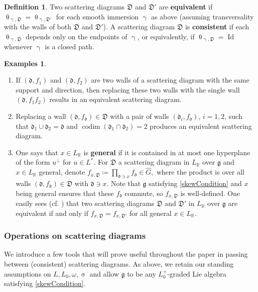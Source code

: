 \documentclass{amsart}
\DeclareMathOperator{\codim}{codim}
\DeclareMathOperator{\id}{Id}
\let\bb=\mathbb
\let\f=\mathfrak
\renewcommand{\theta}{\uptheta}
\renewcommand{\gamma}{\upgamma}
\renewcommand{\sigma}{\upsigma}
\theoremstyle{plain}%
\theoremstyle{definition}
\newtheorem{dfn}[thm]{Definition}
\newtheorem{egs}[thm]{Examples}
\theoremstyle{remark}
\begin{document}
\begin{dfn}
Two scattering diagrams $\f{D}$ and $\f{D}'$ are  \textbf{equivalent} if $\theta_{\gamma,\f{D}} = \theta_{\gamma,\f{D}'}$ for each smooth immersion $\gamma$ as above (assuming transversality with the walls of both $\f{D}$ and $\f{D}'$).  A scattering diagram $\f{D}$ is \textbf{consistent} if each $\theta_{\gamma,\f{D}}$ depends only on the endpoints of $\gamma$, or equivalently, if $\theta_{\gamma,\f{D}}=\id$ whenever $\gamma$ is a closed path.
\end{dfn}

\begin{egs}\label{EquivEx}
~

\begin{enumerate}
    \item If $(\f{d},f_1)$ and $(\f{d},f_2)$ are two walls of a scattering diagram with the same support and direction, then replacing these two walls with the single wall $(\f{d},f_1f_2)$ results in an equivalent scattering diagram.
    \item Replacing a wall $(\f{d},f_{\f{d}})\in \f{D}$ with a pair of walls $(\f{d}_i,f_{\f{d}})$, $i=1,2$, such that $\f{d}_1\cup \f{d}_2=\f{d}$ and $\codim(\f{d}_1\cap \f{d}_2)=2$ produces an equivalent scattering diagram.
    \item One says that $x\in L_{\bb{R}}$ is \textbf{general} if it is contained in at most one hyperplane of the form $u^{\perp}$ for $u\in L^*$.  For $\f{D}$ a scattering diagram in $L_{\bb{R}}$ over $\f{g}$ and $x\in L_{\bb{R}}$ general, denote $f_{x,\f{D}}\coloneqq \prod_{\f{d}\ni x} f_{\f{d}}\in \hat{G},$ where the product is over all walls $(\f{d},f_{\f{d}})\in \f{D}$ with $\f{d}\ni x$.  Note that $\f{g}$ satisfying \eqref{skewCondition} and $x$ being general ensures that these $f_{\f{d}}$ commute, so $f_{x,\f{D}}$ is well-defined.  One easily sees (cf. \cite[Lem. 1.9]{GHKK}) that two scattering diagrams $\f{D}$ and $\f{D}'$ in $L_{\bb{R}}$ over $\f{g}$ are equivalent if and only if $f_{x,\f{D}}=f_{x,\f{D}'}$ for all general $x\in L_{\bb{R}}$.
\end{enumerate}
\end{egs}


\subsubsection{Operations on scattering diagrams}
\label{ScatOperations}
We introduce a few tools that will prove useful throughout the paper in passing between (consistent) scattering diagrams.  As above, we retain our standing assumptions on $L,L_0,\omega,\sigma$ and allow $\f{g}$ to be any $L_0^+$-graded Lie algebra satisfying \eqref{skewCondition}.
\end{document}
